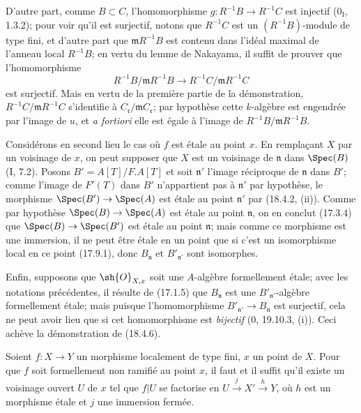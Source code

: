 D'autre part, comme $B\subset C$, l'homomorphisme $g:R^{-1}B\to R^{-1}C$ est injectif ($0_{\mathrm I}$, 1.3.2); pour voir qu'il est surjectif, notons que $R^{-1}C$ est un $(R^{-1}B)$-module de type fini, et d'autre part que $\mathfrak mR^{-1}B$ est contenu dans l'idéal maximal de l'anneau local $R^{-1}B$; en vertu du lemme de Nakayama, il suffit de prouver que l'homomorphisme
\[
  R^{-1}B/\mathfrak mR^{-1}B\longrightarrow R^{-1}C/\mathfrak mR^{-1}C
\]
est surjectif. Mais en vertu de la première partie de la démonstration, $R^{-1}C/\mathfrak mR^{-1}C$ s'identifie à $C_{\mathfrak r}/\mathfrak mC_{\mathfrak r}$; par hypothèse cette $k$-algèbre est engendrée par l'image de $u$, et \emph{a fortiori} elle est égale à l'image de $R^{-1}B/\mathfrak mR^{-1}B$.

Considérons en second lieu le cas où $f$ est étale au point $x$. En remplaçant $X$ par un voisinage de $x$, on peut supposer que $X$ est un voisinage de $\mathfrak n$ dans $\Spec(B)$ (I, 7.2). Posons $B'=A[T]/F.A[T]$ et soit $\mathfrak n'$ l'image réciproque de $\mathfrak n$ dans $B'$; comme l'image de $F'(T)$ dans $B'$ n'appartient pas à $\mathfrak n'$ par hypothèse, le morphisme $\Spec(B')\to\Spec(A)$ est étale au point $\mathfrak n'$ par (18.4.2, (ii)). Comme par hypothèse $\Spec(B)\to\Spec(A)$ est étale au point $\mathfrak n$, on en conclut (17.3.4) que $\Spec(B)\to\Spec(B')$ est étale au point $\mathfrak n$; mais comme ce morphisme est une immersion, il ne peut être étale en un point que si c'est un isomorphisme local en ce point (17.9.1), donc $B_{\mathfrak n}$ et $B'_{\mathfrak n'}$ sont isomorphes.

Enfin, supposons que $\sh{O}_{X,x}$ soit une $A$-algèbre formellement étale; avec les notations précédentes, il résulte de (17.1.5) que $B_{\mathfrak n}$ est une $B'_{\mathfrak n'}$-algèbre formellement étale; mais puisque l'homomorphisme $B'_{\mathfrak n'}\to B_{\mathfrak n}$ est surjectif, cela ne peut avoir lieu que si cet homomorphisme est \emph{bijectif} (0, 19.10.3, (i)). Ceci achève la démonstration de (18.4.6).

\begin{corollary}[18.4.7]
\label{IV.18.4.7}
Soient $f:X\to Y$ un morphisme localement de type fini, $x$ un point de $X$. Pour que $f$ soit formellement non ramifié au point $x$, il faut et il suffit qu'il existe un voisinage ouvert $U$ de $x$ tel que $f|U$ se factorise en $U\xrightarrow{j}X'\xrightarrow{h}Y$, où $h$ est un morphisme étale et $j$ une immersion fermée.
\end{corollary}

